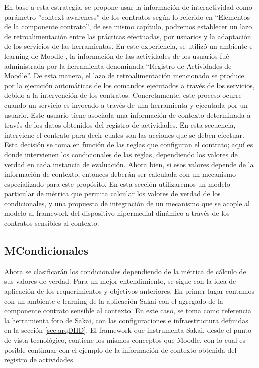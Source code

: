 \begin{itemize}
En base a esta estrategia, se propone usar la información de interactividad como parámetro ''context-awareness'' de los contratos según lo referido en “Elementos de la componente contrato”, de ese mismo capítulo, podremos establecer un lazo de retroalimentación entre las prácticas efectuadas, por usuarios y la adaptación de los servicios de las herramientas. En este experiencia, se utilizó un ambiente e-learning de Moodle \cite{Moodle}, la información de las actividades de los usuarios fué administrada por la herramienta denominada ``Registro de Actividades de Moodle''. De esta manera, el lazo de retroalimentación mencionado se produce por la ejecución automáticas de los comandos ejecutados a través de los servicios, debido a la intervención de los contratos. Concretamente, este proceso ocurre cuando un servicio es invocado a través de una herramienta y ejecutada por un usuario. Este usuario tiene asociada una información de contexto determinada a través de los datos obtenidos del registro de actividades. En esta secuencia, interviene el contrato para decir cuales son las acciones que se deben efectuar. Esta decisión se toma en función de las reglas que configuran el contrato; aquí es donde intervienen los condicionales de las reglas, dependiendo los valores de verdad en cada instancia de evaluación. Ahora bien, si esos valores depende de la información de contexto, entonces deberán ser calculada con un mecanismo especializado para este propósito. En esta sección utilizaremos un modelo particular de métrica que permita calcular los valores de verdad de los condicionales, y una propuesta de integración de un mecanismo que se acople al modelo al framework del dispositivo hipermedial dinámico a través de los contratos sensibles al contexto.


\subsection{MCondicionales}


Ahora se clasificarán los condicionales dependiendo de la métrica de cálculo de sus valores de verdad. Para un mejor entendimiento, se sigue con la idea de aplicación de los requerimientos y objetivos anteriores. En primer lugar contamos con un ambiente e-learning de la aplicación Sakai con el agregado de la componente contrato sensible al contexto. En este caso, se toma como referencia la herramienta foro de Sakai, con las configuraciones e infraestructura definidas en la sección \ref{sec:arqDHD}. El framework que instrumenta Sakai, desde el punto de vista tecnológico, contiene los mismos conceptos que Moodle, con lo cual es posible continuar con el ejemplo de la información de contexto obtenida del registro de actividades. 



\end{itemize}

